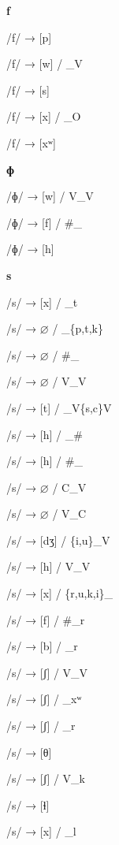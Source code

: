 \begin{center}\textbf{f}\end{center}
\begin{multicols}{4}
\noindent /f/ → [p]

\noindent /f/ → [w] / \_V

\noindent /f/ → [s]

\noindent /f/ → [x] / \_O

\noindent /f/ → [xʷ]
\end{multicols}


\begin{center}\textbf{ɸ}\end{center}
\begin{multicols}{4}
\noindent /ɸ/ → [w] / V\_V

\noindent /ɸ/ → [f] / \#\_

\noindent /ɸ/ → [h]
\end{multicols}

\begin{center}\textbf{s}\end{center}
\begin{multicols}{4}
\noindent /s/ → [x] / \_t

\noindent /s/ → $\varnothing$ / \_\{p,t,k\}

\noindent /s/ → $\varnothing$ / \#\_

\noindent /s/ → $\varnothing$ / V\_V

\noindent /s/ → [t] / \_V\{s,c\}V

\noindent /s/ → [h] / \_\#

\noindent /s/ → [h] / \#\_

\noindent /s/ → $\varnothing$ / C\_V

\noindent /s/ → $\varnothing$ / V\_C

\noindent /s/ → [dʒ] / \{i,u\}\_V

\noindent /s/ → [h] / V\_V

\noindent /s/ → [x] / \{r,u,k,i\}\_

\noindent /s/ → [f] / \#\_r

\noindent /s/ → [b] / \_r

\noindent /s/ → [ʃ] / V\_V

\noindent /s/ → [ʃ] / \_xʷ

\noindent /s/ → [ʃ] / \_r

\noindent /s/ → [θ]

\noindent /s/ → [ʃ] / V\_k

\noindent /s/ → [ɬ]

\noindent /s/ → [x] / \_l
\end{multicols}



